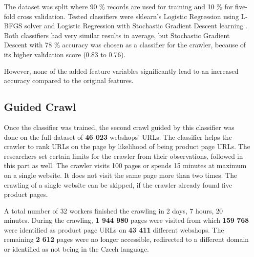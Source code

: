     The dataset was split where 90 \% records are used for training and 10 \% for five-fold cross validation. Tested classifiers were sklearn's Logistic Regression using L-BFGS solver\cite{logistic-sklearn} and Logistic Regression with Stochastic Gradient Descent learning \cite{sgd-sklearn}. Both classifiers had very similar results in average, but Stochastic Gradient Descent with 78 \% accuracy was chosen as a classifier for the crawler, because of its higher validation score (0.83 to 0.76).

    However, none of the added feature variables significantly lead to an increased accuracy compared to the original features.

    \subsection{Guided Crawl}

    Once the classifier was trained, the second crawl guided by this classifier was done on the full dataset of \textbf{46 023} webshops' URLs. The classifier helps the crawler to rank URLs on the page by likelihood of being product page URLs. The researchers set certain limits for the crawler from their observations, followed in this part as well. The crawler visits 100 pages or spends 15 minutes at maximum on a single website. It does not visit the same page more than two times. The crawling of a single website can be skipped, if the crawler already found five product pages.

    A total number of 32 workers finished the crawling in 2 days, 7 hours, 20 minutes. During the crawling, \textbf{1 944 980} pages were visited from which \textbf{159 768} were identified as product page URLs on \textbf{43 411} different webshops. The remaining \textbf{2 612} pages were no longer accessible, redirected to a different domain or identified as not being in the Czech language.

